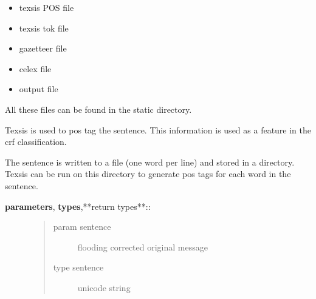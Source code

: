 \documentclass[letterpaper,10pt,english]{sphinxmanual}
\begin{document}
\begin{fulllineitems}
\begin{fulllineitems}
\begin{itemize}
\item {} 
texsis POS file

\item {} 
texsis tok file

\item {} 
gazetteer file

\item {} 
celex file

\item {} 
output file

\end{itemize}

All these files can be found in the static directory.

\end{fulllineitems}


\begin{fulllineitems}
\label{API:norm.modules.new_NE.New_NE.run_texsis}
Texsis is used to pos tag the sentence. This information is used as a feature in the crf classification.

\end{fulllineitems}


\begin{fulllineitems}
\label{API:norm.modules.new_NE.New_NE.write_file}
The sentence is written to a file (one word per line) and stored in a directory. Texsis can be run on this directory to 
generate pos tags for each word in the sentence.
\begin{description}
\item[{\textbf{parameters}, \textbf{types},**return types**::}] \leavevmode\begin{quote}\begin{description}
\item[{param sentence}] \leavevmode
flooding corrected original message

\item[{type sentence}] \leavevmode
unicode string

\end{description}\end{quote}

\end{description}

\end{fulllineitems}


\end{fulllineitems}
\end{document}
